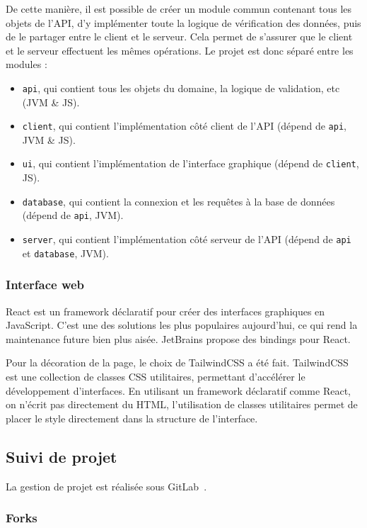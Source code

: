De cette manière, il est possible de créer un module commun contenant tous les objets de l'API, d'y implémenter toute la logique de vérification des données, puis de le partager entre le client et le serveur.
Cela permet de s'assurer que le client et le serveur effectuent les mêmes
opérations.
Le projet est donc séparé entre les modules :
\begin{itemize}
	\item \lstinline{api}, qui contient tous les objets du domaine, la logique de validation, etc (JVM \& JS).
	\item \lstinline{client}, qui contient l'implémentation côté client de l'API (dépend de \lstinline{api}, JVM \& JS).
	\item \lstinline{ui}, qui contient l'implémentation de l'interface graphique (dépend de \lstinline{client}, JS).
	\item \lstinline{database}, qui contient la connexion et les requêtes à la base de données (dépend de \lstinline{api}, JVM).
	\item \lstinline{server}, qui contient l'implémentation côté serveur de l'API (dépend de \lstinline{api} et \lstinline{database}, JVM).
\end{itemize}

\subsubsection{Interface web}

React est un framework déclaratif pour créer des interfaces graphiques en JavaScript.
C'est une des solutions les plus populaires aujourd'hui, ce qui rend la maintenance future bien plus aisée.
JetBrains propose des bindings pour React.

Pour la décoration de la page, le choix de TailwindCSS a été fait.
TailwindCSS est une collection de classes CSS utilitaires, permettant d'accélérer le développement d'interfaces.
En utilisant un framework déclaratif comme React, on n'écrit pas directement du HTML, l'utilisation de classes utilitaires permet de placer le style directement dans la structure de l'interface.

\subsection{Suivi de projet}\label{subsec:suivi-de-projet}

La gestion de projet est réalisée sous GitLab~\cite{gitlab}.

\subsubsection{Forks}

